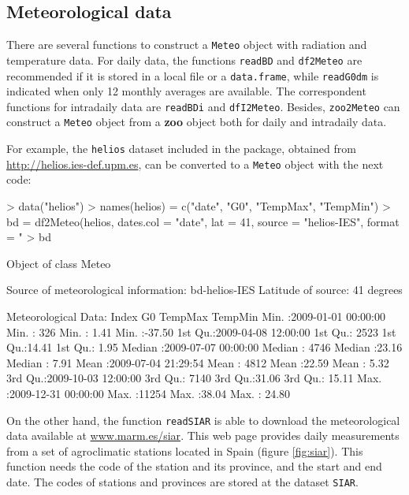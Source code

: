 \documentclass[a4paper]{article}
\renewenvironment{Schunk}{\vspace{\topsep}}{\vspace{\topsep}}
\newcommand{\code}[1]{{\texttt{#1}}}
\newcommand{\pkg}[1]{{\textbf{#1}}}
\begin{document}
\subsection{Meteorological data}
\label{sec:meteo}
There are several functions to construct a \code{Meteo} object with
radiation and temperature data.  For daily data, the functions
\code{readBD} and \code{df2Meteo} are recommended if it is stored in a
local file or a \code{data.frame}, while \code{readG0dm} is indicated
when only 12 monthly averages are available. The correspondent
functions for intradaily data are \code{readBDi} and
\code{dfI2Meteo}. Besides, \code{zoo2Meteo} can construct a
\code{Meteo} object from a \pkg{zoo} object both for daily and
intradaily data.

For example, the \code{helios} dataset included in the package,
obtained from \url{http://helios.ies-def.upm.es}, can be converted to
a \code{Meteo} object with the next code:
\begin{Schunk}
\begin{Sinput}
> data("helios")
> names(helios) = c("date", "G0", "TempMax", "TempMin")
> bd = df2Meteo(helios, dates.col = "date", lat = 41, source = "helios-IES", 
     format = "%Y/%m/%d")
> bd
\end{Sinput}
\begin{Soutput}
Object of class  Meteo 

Source of meteorological information: bd-helios-IES 
Latitude of source:  41 degrees

Meteorological Data:
     Index                           G0           TempMax         TempMin      
 Min.   :2009-01-01 00:00:00   Min.   :  326   Min.   : 1.41   Min.   :-37.50  
 1st Qu.:2009-04-08 12:00:00   1st Qu.: 2523   1st Qu.:14.41   1st Qu.:  1.95  
 Median :2009-07-07 00:00:00   Median : 4746   Median :23.16   Median :  7.91  
 Mean   :2009-07-04 21:29:54   Mean   : 4812   Mean   :22.59   Mean   :  5.32  
 3rd Qu.:2009-10-03 12:00:00   3rd Qu.: 7140   3rd Qu.:31.06   3rd Qu.: 15.11  
 Max.   :2009-12-31 00:00:00   Max.   :11254   Max.   :38.04   Max.   : 24.80  
\end{Soutput}
\end{Schunk}

On the other hand, the function \code{readSIAR} is able to download
the meteorological data available at \url{www.marm.es/siar}.  This
web page provides daily measurements from a set of agroclimatic
stations located in Spain (figure \ref{fig:siar}). This function needs
the code of the station and its province, and the start and end
date. The codes of stations and provinces are stored at the dataset
\code{SIAR}. 
\end{document}
